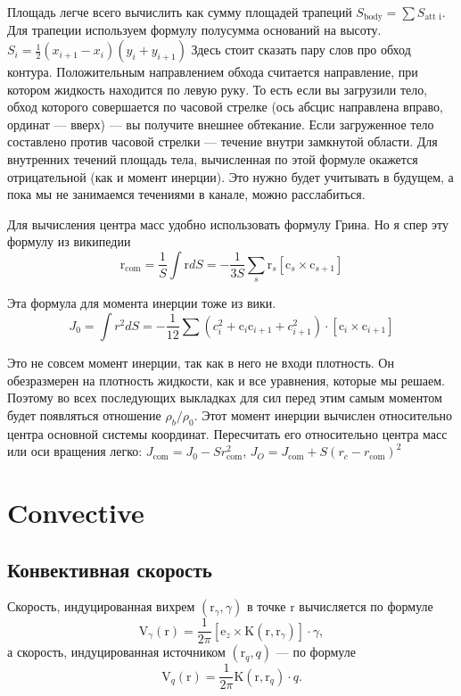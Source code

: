 \documentclass[14pt]{extreport}
\newcommand{\br}[1]{\boldsymbol{\mathrm{#1}}}
\renewcommand{\vec}[1]{\br{#1}}
\begin{document}
Площадь легче всего вычислить как сумму площадей трапеций $S_\text{body} = \sum S_\text{att~i}$. Для трапеции используем формулу полусумма оснований на высоту. $S_i = \frac{1}{2}(x_{i+1}-x_i)(y_i+y_{i+1})$
Здесь стоит сказать пару слов про обход контура. Положительным направлением обхода считается направление, при котором жидкость находится по левую руку. То есть если вы загрузили тело, обход которого совершается по часовой стрелке (ось абсцис направлена вправо, ординат --- вверх) --- вы получите внешнее обтекание. Если загруженное тело составлено против часовой стрелки --- течение внутри замкнутой области. Для внутренних течений площадь тела, вычисленная по этой формуле окажется отрицательной (как и момент инерции). Это нужно будет учитывать в будущем, а пока мы не занимаемся течениями в канале, можно расслабиться.

Для вычисления центра масс удобно использовать формулу Грина. Но я спер эту формулу из википедии
\begin{equation*}
\vec r_\text{com}
= \dfrac{1}{S}\int \vec r dS
= -\dfrac{1}{3S}\sum_s \vec r_s [\vec c_{s} \times \vec c_{s+1}]
\end{equation*}

Эта формула для момента инерции тоже из вики.
\begin{equation*}
J_0 = \int r^2 dS =
-\dfrac{1}{12} \sum 
\left(
	c_i^2 + \vec c_i \vec c_{i+1} + c_{i+1}^2
\right) \cdot [\vec c_i \times \vec c_{i+1}]
\end{equation*}

Это не совсем момент инерции, так как в него не входи плотность. Он обезразмерен на плотность жидкости, как и все уравнения, которые мы решаем. Поэтому во всех последующих выкладках для сил перед этим самым моментом будет появляться отношение $\rho_b/\rho_0$.
Этот момент инерции вычислен относительно центра основной системы координат. Пересчитать его относительно центра масс или оси вращения легко: $J_\text{com} = J_0 - S r_\text{com}^2$, $J_O = J_\text{com} + S (r_c - r_\text{com})^2$

\section{Convective}
\subsection{Конвективная скорость}
Скорость, индуцированная вихрем $(\vec r_\gamma, \gamma)$ в точке $\vec r$
вычисляется по формуле
\begin{equation}
\label{eq_VortexConvective}
\vec V_\gamma(\vec r) = \frac{1}{2\pi} [\vec e_z \times \vec K(\vec r, \vec r_\gamma)] \cdot \gamma,
\end{equation}
а скорость, индуцированная источником $(\vec r_q, q)$ --- по формуле
\begin{equation}
\label{eq_SourceConvective}
\vec V_q(\vec r) = \frac{1}{2\pi} \vec K(\vec r, \vec r_q) \cdot q.
\end{equation}
\end{document}
